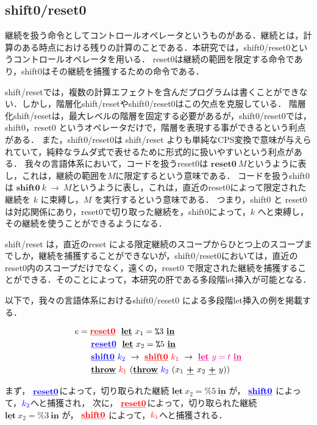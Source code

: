 \documentclass[T]{compsoft}
\newcommand\red[1]{\textcolor{red}{#1}}
\newcommand\magenta[1]{\textcolor{magenta}{#1}}
\newcommand\blue[1]{\textcolor{blue}{#1}}
\newcommand\cResetz{\underline{\textbf{reset0}}}
\newcommand\cShiftz{\underline{\textbf{shift0}}}
\newcommand\cThrow{\underline{\textbf{throw}}}
\newcommand\cPlus{\underline{\textbf{+}}}
\newcommand\cLet{\underline{\textbf{let}}}
\newcommand\cIn{\underline{\textbf{in}}}
\newcommand\csp[1]{\texttt{\%}{#1}}
\theoremstyle{break}
\begin{document}
\subsection{shift0/reset0}
継続を扱う命令としてコントロールオペレータというものがある．継続とは，計算のある時点における残りの計算のことである．本研究では，shift0/reset0というコントロールオペレータを用いる．
reset0は継続の範囲を限定する命令であり，shift0はその継続を捕獲するための命令である．

shift/reset\cite{Danvy1990}では，複数の計算エフェクトを含んだプログラムは書くことができない．しかし，階層化shift/resetやshift0/reset0はこの欠点を克服している．
階層化shift/reset\cite{Danvy1990}は，最大レベルの階層を固定する必要があるが，shift0/reset0では，shift0，reset0 というオペレータだけで，階層を表現する事ができるという利点がある．
また，shift0/reset0は shift/reset よりも単純なCPS変換で意味が与えられていて，純粋なラムダ式で表せるために形式的に扱いやすいという利点がある．
我々の言語体系において，コードを扱うreset0は $\cResetz ~M$というように表し，これは，継続の範囲を$M$に限定するという意味である．
コードを扱うshift0は $\cShiftz ~k ~\to ~M$というように表し，これは，直近のreset0によって限定された継続を $k$ に束縛し，$M$ を実行するという意味である．
つまり，shift0 と reset0 は対応関係にあり，reset0で切り取った継続を，shift0によって，$k$ へと束縛し，その継続を使うことができるようになる．

shift/reset\cite{Danvy1990} は，直近のreset による限定継続のスコープからひとつ上のスコープまでしか，継続を捕獲することができないが，shift0/reset0においては，直近の reset0内のスコープだけでなく，遠くの，reset0 で限定された継続を捕獲することができる．そのことによって，本研究の肝である多段階let挿入が可能となる．

以下で，我々の言語体系におけるshift0/reset0 による多段階let挿入の例を掲載する．

\begin{align*}
    e &= \red{\cResetz} ~~\cLet~x_1=\csp{3}~\cIn \\
      &\phantom{=}~~ \blue{\cResetz} ~~\cLet~x_2=\csp{5}~\cIn \\
      &\phantom{=}~~ \blue{\cShiftz}~\blue{k_2}~\to~ \red{\cShiftz}~\red{k_1}~\to~ \magenta{\cLet~y=t~\cIn} \\
      &\phantom{=}~~ \cThrow~\red{k_1}~(\cThrow~\blue{k_2}~(x_1~\cPlus~x_2~\cPlus~y))
\end{align*}

まず，
$\blue{\cResetz}$によって，切り取られた継続 $\cLet~x_2=\csp{5}~\cIn$ が，
$\blue{\cShiftz}$ によって，$\blue{k_2}$へと捕獲され，
次に，
$\red{\cResetz}$によって，切り取られた継続 $\cLet~x_2=\csp{3}~\cIn$ が，
$\red{\cShiftz}$ によって，$\red{k_1}$へと捕獲される．
\end{document}
